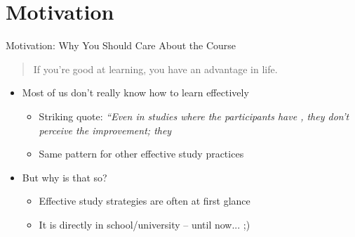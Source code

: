 \documentclass{ercisbeamer}
\begin{document}
\section{Motivation}
\begin{frame}{Motivation: Why You Should Care About the Course}
    \begin{quote}
    If you're good at learning, you have an advantage in life. 
    \end{quote}
    \vspace{1em}
    \begin{itemize}
        \item Most of us don't really know how to learn effectively
        \begin{itemize}
            \item Striking quote: \emph{``Even in studies where the participants have , they don't perceive the improvement; they  }
            \item Same pattern for other effective study practices
        \end{itemize}
        \item But why is that so?
        \begin{itemize}
            \item Effective study strategies are often  at first glance
            \item It is  directly  in school/university -- until now... ;)
        \end{itemize}
    \end{itemize}
\end{frame}
\end{document}
